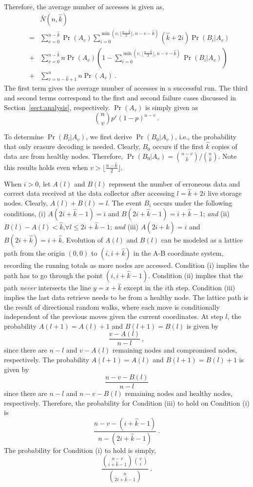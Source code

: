 \documentclass[10pt,journal,letterpaper,compsoc]{IEEEtran}
\newcommand{\0}{{\bf 0}}
\newcounter{step}
\begin{document}
Therefore, the average number of accesses
is given as,
\begin{eqnarray}
\nonumber
& & \bar N(n,\hat{k})
\\ 
\nonumber
&=&\sum_{v=0}^{n-\hat{k}}\Pr(A_v)\sum_{i=0}^{\min(v, \lfloor{\frac{n-\hat{k}}{2}}\rfloor, n-v-\hat{k})}(\hat{k}+2i)\Pr(B_i|A_v) \\
\nonumber
&+& \sum_{v=0}^{n-\hat{k}}n\Pr(A_v)\left(1-\sum_{i=0}^{\min(v, \lfloor{\frac{n-\hat{k}}{2}}\rfloor, n-v-\hat{k})}\Pr(B_i|A_v)\right) \\
&+ &\sum_{v=n-\hat{k}+1}^{n}n\Pr(A_v)~.
\label{average}
\end{eqnarray}
The first term gives the average number of accesses  in a  successful run. The third and second  terms
correspond to the first and second failure cases discussed in Section~\ref{sect:analysis}, respectively.  $\Pr(A_v)$
is simply given as $${n\choose v}p^v(1-p)^{n-v}~.$$

To determine $\Pr(B_i|A_v)$, we first derive $\Pr(B_0|A_v)$, i.e., the
probability that only erasure decoding is needed. Clearly, $B_0$ occurs if
the first $\hat{k}$ copies of data are from healthy nodes. Therefore, $\Pr(B_0|A_v) =
{n-v \choose \hat{k}}/{n \choose \hat{k}}.$ Note this results holds even when $v >
\lfloor{\frac{n-\hat{k}}{2}}\rfloor$.
			
When $i > 0$, let
$A(l)$ and $B(l)$ represent the number of erroneous data and correct data
received at the data collector after accessing $l = \hat{k}+2i$ live storage nodes. Clearly,
$A(l) + B(l) = l$.  The event $B_i$ occurs under the following conditions, (i)
$A(2i+\hat{k}-1) = i$ and $B(2i+\hat{k}-1) = i + \hat{k} - 1$; {\it and} (ii) $B(l) - A(l) <
\hat{k}$,$\forall l \le 2i+\hat{k}-1$; {\it and} (iii) $A(2i+\hat{k}) =  i$ and $B(2i+\hat{k}) = i+\hat{k}$.
Evolution of $A(l)$ and $B(l)$ can be modeled as a lattice path from the origin
$(0,0)$ to $(i, i+\hat{k})$ in the A-B coordinate system, recording the running
totals as more nodes are accessed. Condition (i) implies the
path has to go through the point $(i, i+\hat{k}-1)$.  Condition (ii) implies that the path {\it
never} intersects the line $y = x + \hat{k}$ except in the $i$th step.  Condition (iii) implies the last data
retrieve needs to be from a healthy node. The lattice path is the result of
directional random walks, where each move is conditionally independent of the
previous moves given the current coordinates. At step $l$, the probability $A(l+1) = A(l) + 1$ and $B(l+1) =
B(l)$ is given by
$$\frac{v - A(l)}{n - l}~,$$
since there are $n-l$ and
$v-A(l)$ remaining nodes and compromised nodes, respectively. The probability
$A(l+1) = A(l)$ and $B(l+1) = B(l)+1$ is given by
$$\frac{n - v - B(l)}{n - l}$$
since there are $n-l$ and $n-v-B(l)$ remaining nodes and healthy nodes,
respectively. Therefore, the probability for Condition (iii) to hold on Condition  (i) is
$$\frac{n - v - (i+\hat{k}-1)}{n - (2i+\hat{k}-1)}~.$$ The probability for Condition (i) to hold is simply,
$$\frac{{n-v\choose i+\hat{k}-1}{v \choose i}}{{n \choose 2i+\hat{k}-1}}~.$$
\end{document}
